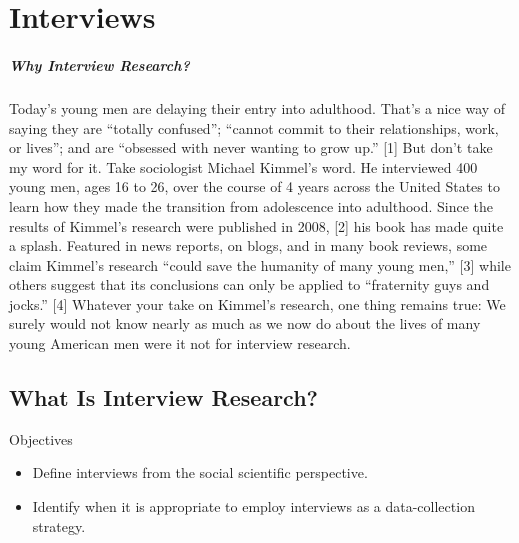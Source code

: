 \chapter{Interviews}\label{ch09:interviews}

\paragraph{Why Interview Research?}

Today’s young men are delaying their entry into adulthood. That’s a nice way of saying they are “totally confused”; “cannot commit to their relationships, work, or lives”; and are “obsessed with never wanting to grow up.” [1] But don’t take my word for it. Take sociologist Michael Kimmel’s word. He interviewed 400 young men, ages 16 to 26, over the course of 4 years across the United States to learn how they made the transition from adolescence into adulthood. Since the results of Kimmel’s research were published in 2008, [2] his book has made quite a splash. Featured in news reports, on blogs, and in many book reviews, some claim Kimmel’s research “could save the humanity of many young men,” [3] while others suggest that its conclusions can only be applied to “fraternity guys and jocks.” [4] Whatever your take on Kimmel’s research, one thing remains true: We surely would not know nearly as much as we now do about the lives of many young American men were it not for interview research.

\section{What Is Interview Research?}

\begin{center}
	\begin{objbox}{Objectives}
		\begin{itemize}
			\setlength{\itemsep}{0pt}
			\setlength{\parskip}{0pt}
			\setlength{\parsep}{0pt}
			
			\item Define interviews from the social scientific perspective.
			\item Identify when it is appropriate to employ interviews as a data-collection strategy.
			
		\end{itemize}
	\end{objbox}
\end{center}

